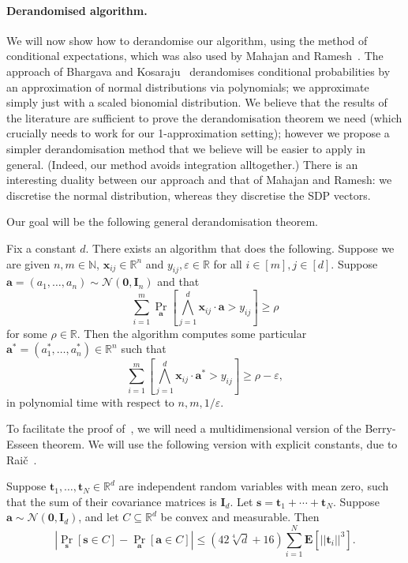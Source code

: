\documentclass[a4paper,11pt, DIV=11]{scrartcl}
\newcommand{\vx}{\ensuremath{\mathbf{x}}}
\newcommand{\va}{\ensuremath{\mathbf{a}}}
\theoremstyle{plain}
\theoremstyle{definition}
\begin{document}
\paragraph{Derandomised algorithm.}
We will now show how to derandomise our algorithm, using
the method of conditional expectations, which was also used by Mahajan
and Ramesh~\cite{Mahajan99:sicomp}. The approach of Bhargava and
Kosaraju~\cite{BK05} derandomises conditional probabilities by an approximation
of normal distributions via polynomials; we approximate simply just with a
scaled bionomial distribution. We believe that the results of the literature are sufficient to prove the derandomisation theorem we need (which crucially needs to work for our 1-approximation setting); however we propose a simpler derandomisation method that we believe will be easier to apply in general. (Indeed, our method avoids integration alltogether.) There is an interesting duality between our approach and that of Mahajan and Ramesh: we discretise the normal distribution, whereas they discretise the SDP vectors.
    

Our goal will be the following general derandomisation theorem.

\begin{theorem}\label{thm:derandGaussian}
    Fix a constant $d$. There exists an algorithm that does the following. Suppose we are given $n, m \in \mathbb{N}$, $\vx_{ij} \in \mathbb{R}^n$ and $y_{ij}, \varepsilon \in \mathbb{R}$ for all $i \in [m], j \in [d]$. Suppose $\va = (a_1, \ldots, a_n) \sim \mathcal{N}(\mathbf{0}, \mathbf{I}_n)$ and that
    \[
    \sum_{i = 1}^m \Pr_{\va}\left[ \bigwedge_{j = 1}^d \vx_{ij} \cdot \va > y_{ij} \right] \geq \rho
    \]
    for some $\rho \in \mathbb{R}$. Then the algorithm computes some particular $\va^* = (a_1^*, \ldots, a_n^*) \in \mathbb{R}^n$ such that
    \[
    \sum_{i =1 }^m \left[ \bigwedge_{j = 1}^d \vx_{ij} \cdot \va^* > y_{ij} \right] \geq \rho - \varepsilon,
    \]
    in polynomial time with respect to $n, m, 1/\varepsilon$.
\end{theorem}

To facilitate the proof of~, we will need a multidimensional version of the Berry-Esseen theorem. We will use the following version with explicit constants, due to Rai\v{c}~\cite{Raic19}.

\begin{theorem}\label{thm:BE}
Suppose $\mathbf{t}_1, \ldots, \mathbf{t}_N \in \mathbb{R}^d$ are independent random variables with mean zero, such that the sum of their covariance matrices is $\mathbf{I}_d$. Let $\mathbf{s} = \mathbf{t}_1 + \cdots + \mathbf{t}_N$. Suppose $\va \sim \mathcal{N}(\mathbf{0}, \mathbf{I}_d)$, and let $C \subseteq \mathbb{R}^d$ be convex and measurable. Then
\[
| \Pr_{\mathbf{s}}[\mathbf{s} \in C] - \Pr_{\va}[\va \in C] | \leq \left(42\sqrt[4]{d} + 16\right) \sum_{i = 1}^N \mathbf{E} \left[ || \mathbf{t}_i ||^3 \right].
\]
\end{theorem}
\end{document}
